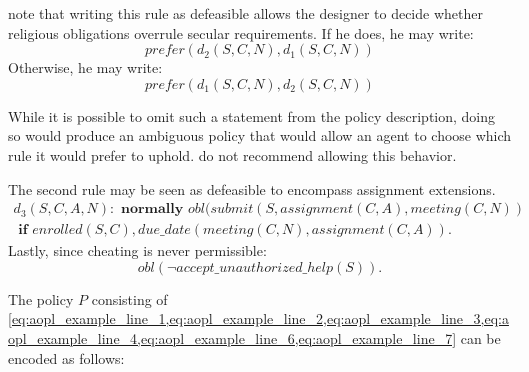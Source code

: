 \citet{gelfond_authorization_2008} note that writing this rule as defeasible allows the designer to decide whether religious obligations overrule secular requirements.
If he does, he may write:
\begin{equation}
    \label{eq:aopl_example_line_4}
    prefer(d_2(S,C,N),d_1(S,C,N))
\end{equation}
Otherwise, he may write:
\begin{equation}
    \label{eq:aopl_example_line_5}
    prefer(d_1(S,C,N), d_2(S,C,N))
\end{equation}

While it is possible to omit such a statement from the policy description, doing so would produce an ambiguous policy that would allow an agent to choose which rule it would prefer to uphold.
\citet{gelfond_authorization_2008} do not recommend allowing this behavior.

The second rule may be seen as defeasible to encompass assignment extensions.
\begin{multline}
    \label{eq:aopl_example_line_6}
    d_3(S,C,A,N): \textbf{ normally } obl(submit(S,assignment(C,A),meeting(C,N)) \\ \textbf{ if } enrolled(S,C), due\_date(meeting(C,N), assignment(C,A)).
\end{multline}
Lastly, since cheating is never permissible:
\begin{equation}
    \label{eq:aopl_example_line_7}
    obl(\neg accept\_unauthorized\_help(S)).
\end{equation}

The policy $P$ consisting of \cref{eq:aopl_example_line_1,eq:aopl_example_line_2,eq:aopl_example_line_3,eq:aopl_example_line_4,eq:aopl_example_line_6,eq:aopl_example_line_7} can be encoded as follows:


